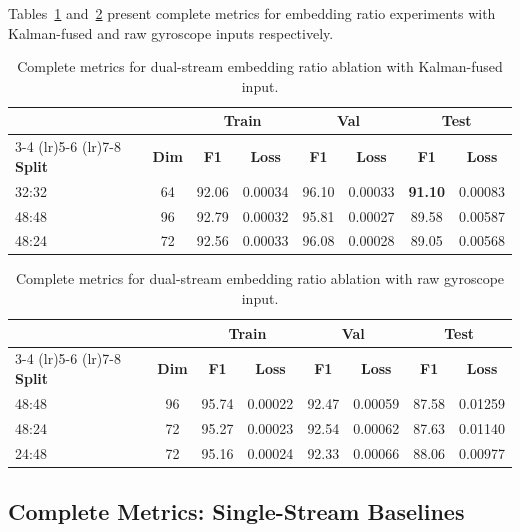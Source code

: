 Tables~\ref{tab:embed_kalman_full} and~\ref{tab:embed_raw_full} present complete metrics for embedding ratio experiments with Kalman-fused and raw gyroscope inputs respectively.

\begin{table}[H]
\caption{Complete metrics for dual-stream embedding ratio ablation with Kalman-fused input.}
\label{tab:embed_kalman_full}
\centering
\small
\begin{tabular}{lccccccc}
\toprule
& & \multicolumn{2}{c}{\textbf{Train}} & \multicolumn{2}{c}{\textbf{Val}} & \multicolumn{2}{c}{\textbf{Test}} \\
\cmidrule(lr){3-4} \cmidrule(lr){5-6} \cmidrule(lr){7-8}
\textbf{Split} & \textbf{Dim} & \textbf{F1} & \textbf{Loss} & \textbf{F1} & \textbf{Loss} & \textbf{F1} & \textbf{Loss} \\
\midrule
32:32 & 64 & 92.06 & 0.00034 & 96.10 & 0.00033 & \textbf{91.10} & 0.00083 \\
48:48 & 96 & 92.79 & 0.00032 & 95.81 & 0.00027 & 89.58 & 0.00587 \\
48:24 & 72 & 92.56 & 0.00033 & 96.08 & 0.00028 & 89.05 & 0.00568 \\
\bottomrule
\end{tabular}
\end{table}

\begin{table}[H]
\caption{Complete metrics for dual-stream embedding ratio ablation with raw gyroscope input.}
\label{tab:embed_raw_full}
\centering
\small
\begin{tabular}{lccccccc}
\toprule
& & \multicolumn{2}{c}{\textbf{Train}} & \multicolumn{2}{c}{\textbf{Val}} & \multicolumn{2}{c}{\textbf{Test}} \\
\cmidrule(lr){3-4} \cmidrule(lr){5-6} \cmidrule(lr){7-8}
\textbf{Split} & \textbf{Dim} & \textbf{F1} & \textbf{Loss} & \textbf{F1} & \textbf{Loss} & \textbf{F1} & \textbf{Loss} \\
\midrule
48:48 & 96 & 95.74 & 0.00022 & 92.47 & 0.00059 & 87.58 & 0.01259 \\
48:24 & 72 & 95.27 & 0.00023 & 92.54 & 0.00062 & 87.63 & 0.01140 \\
24:48 & 72 & 95.16 & 0.00024 & 92.33 & 0.00066 & 88.06 & 0.00977 \\
\bottomrule
\end{tabular}
\end{table}

\subsection{Complete Metrics: Single-Stream Baselines}
\label{app:single_full}

